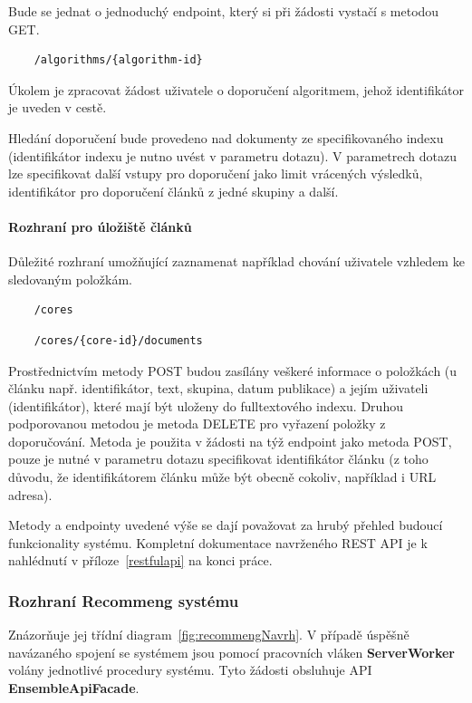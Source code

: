 \documentclass[thesis=M,czech]{FITthesis}[2014/05/07]
\begin{document}
Bude se jednat o jednoduchý endpoint, který si při žádosti vystačí s metodou GET.

\begin{verbatim}
	/algorithms/{algorithm-id}
\end{verbatim}

Úkolem je zpracovat žádost uživatele o doporučení algoritmem, jehož identifikátor je uveden v cestě. 

Hledání doporučení bude provedeno nad dokumenty ze specifikovaného indexu (identifikátor indexu je nutno uvést v parametru dotazu). V parametrech dotazu lze specifikovat další vstupy pro doporučení jako limit vrácených výsledků, identifikátor pro doporučení článků z jedné skupiny a další.

\paragraph{Rozhraní pro úložiště článků}

Důležité rozhraní umožňující zaznamenat například chování uživatele vzhledem ke sledovaným položkám.

\begin{verbatim}
	/cores
\end{verbatim}

\begin{verbatim}
	/cores/{core-id}/documents
\end{verbatim}

Prostřednictvím metody POST budou zasílány veškeré informace o položkách (u článku např. identifikátor, text, skupina, datum publikace) a jejím uživateli (identifikátor), které mají být uloženy do fulltextového indexu. Druhou podporovanou metodou je metoda DELETE pro vyřazení položky z doporučování. Metoda je použita v žádosti na týž endpoint jako metoda POST, pouze je nutné v parametru dotazu specifikovat identifikátor článku (z toho důvodu, že identifikátorem článku může být obecně cokoliv, například i URL adresa).

Metody a endpointy uvedené výše se dají považovat za hrubý přehled budoucí funkcionality systému. Kompletní dokumentace navrženého REST API je k nahlédnutí v příloze~\ref{restfulapi} na konci práce.

\subsubsection{Rozhraní Recommeng systému}
Znázorňuje jej třídní diagram~\ref{fig:recommengNavrh}. V případě úspěšně navázaného spojení se systémem jsou pomocí pracovních vláken \textbf{ServerWorker} volány jednotlivé procedury systému. Tyto žádosti obsluhuje API \textbf{EnsembleApiFacade}.
\end{document}
